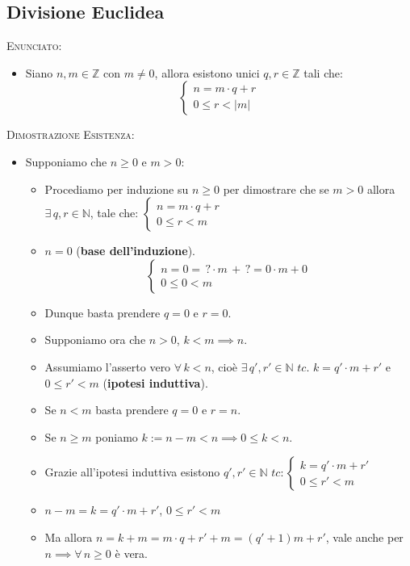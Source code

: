\documentclass[10pt]{article}
\begin{document}
\subsection{Divisione Euclidea}
\textsc{Enunciato:}
\begin{itemize}
\item
Siano $n,m \in \mathbb{Z}$ con $m \neq 0$, allora esistono unici $q,r \in \mathbb{Z}$ tali che:
\[
\begin{cases}
n=m \cdot q + r \\
0 \leq r < |m|
\end{cases}
\]
\end{itemize}
\textsc{Dimostrazione Esistenza:}
\begin{itemize}
\item
Supponiamo che $n \geq 0$ e $m > 0$:
\begin{itemize}
\item
Procediamo per induzione su $n \geq 0$ per dimostrare che se $m \!>\! 0$ allora $\exists \, q,r \in \mathbb{N}$, tale che: $\begin{cases} n = m \cdot q + r \\ 0 \leq r < m \end{cases}$
\item
$n=0$ (\textbf{base dell'induzione}).
$$\begin{cases} n = 0 = \,? \cdot m \, + \, ? = 0 \cdot m + 0 \\ 0 \leq 0 < m \end{cases}$$
\item
Dunque basta prendere $q = 0$ e $r=0$.
\item
Supponiamo ora che $n > 0$, $k < m \implies n$.
\item
Assumiamo l'asserto vero $\forall \, k < n$, cioè $\exists \, q', r' \in \mathbb{N} \,\, tc. \,\, k = q' \cdot m + r'$ e $0 \leq r' < m$ (\textbf{ipotesi induttiva}).
\item
Se $n < m$ basta prendere $q = 0$ e $r = n$.
\item
Se $n \geq m$ poniamo $k := n - m < n \implies 0 \leq k < n$.
\item
Grazie all'ipotesi induttiva esistono $q', r' \in \mathbb{N} \,\,tc:\begin{cases} k = q' \cdot m + r' \\ 0 \leq r' < m \end{cases}$
\item
$n-m = k = q' \cdot m + r'$, $0 \leq r' < m$
\item
Ma allora $n = k + m = m \cdot q + r' + m = (q' + 1)m + r'$, vale anche per $n \implies \forall \,n \geq 0$ è vera.

\end{itemize}
\end{itemize}
\end{document}
